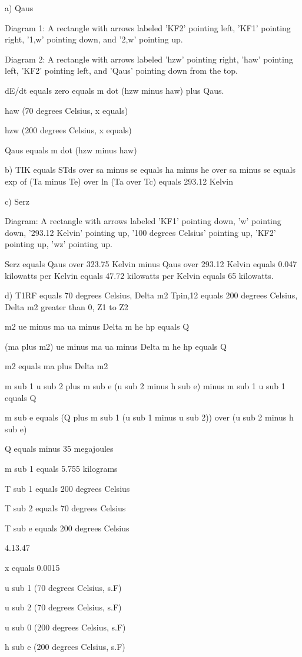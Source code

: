 a) Qaus

Diagram 1: A rectangle with arrows labeled 'KF2' pointing left, 'KF1' pointing right, '1,w' pointing down, and '2,w' pointing up.

Diagram 2: A rectangle with arrows labeled 'hzw' pointing right, 'haw' pointing left, 'KF2' pointing left, and 'Qaus' pointing down from the top.

dE/dt equals zero equals m dot (hzw minus haw) plus Qaus.

haw (70 degrees Celsius, x equals)

hzw (200 degrees Celsius, x equals)

Qaus equals m dot (hzw minus haw)

b) TIK equals STds over sa minus se equals ha minus he over sa minus se equals exp of (Ta minus Te) over ln (Ta over Tc) equals 293.12 Kelvin

c) Serz

Diagram: A rectangle with arrows labeled 'KF1' pointing down, 'w' pointing down, '293.12 Kelvin' pointing up, '100 degrees Celsius' pointing up, 'KF2' pointing up, 'wz' pointing up.

Serz equals Qaus over 323.75 Kelvin minus Qaus over 293.12 Kelvin equals 0.047 kilowatts per Kelvin equals 47.72 kilowatts per Kelvin equals 65 kilowatts.

d) T1RF equals 70 degrees Celsius, Delta m2 Tpin,12 equals 200 degrees Celsius, Delta m2 greater than 0, Z1 to Z2

m2 ue minus ma ua minus Delta m he hp equals Q

(ma plus m2) ue minus ma ua minus Delta m he hp equals Q

m2 equals ma plus Delta m2

m sub 1 u sub 2 plus m sub e (u sub 2 minus h sub e) minus m sub 1 u sub 1 equals Q

m sub e equals (Q plus m sub 1 (u sub 1 minus u sub 2)) over (u sub 2 minus h sub e)

Q equals minus 35 megajoules

m sub 1 equals 5.755 kilograms

T sub 1 equals 200 degrees Celsius

T sub 2 equals 70 degrees Celsius

T sub e equals 200 degrees Celsius

4.13.47

x equals 0.0015

u sub 1 (70 degrees Celsius, s.F)

u sub 2 (70 degrees Celsius, s.F)

u sub 0 (200 degrees Celsius, s.F)

h sub e (200 degrees Celsius, s.F)